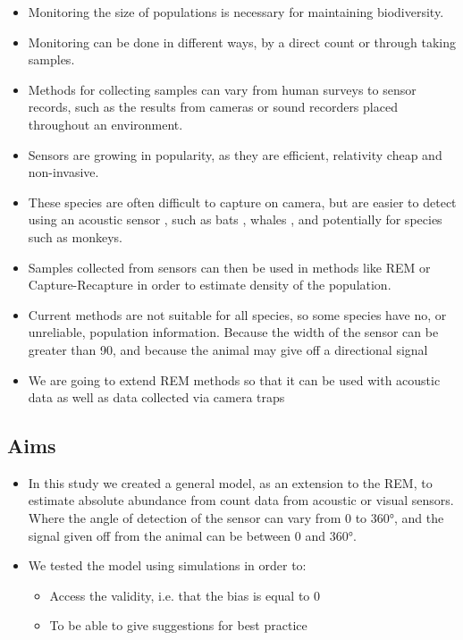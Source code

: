 \documentclass[a4paper,10pt,reqno,oneside]{amsart}
\begin{document}
\begin{itemize}
\item Monitoring the size of populations is necessary for maintaining biodiversity.
\item Monitoring can be done in different ways, by a direct count or through taking samples. \citep{pollock2002large}
\item Methods for collecting samples can vary from human surveys to sensor records, such as the results from cameras or sound recorders placed throughout an environment. 
\item Sensors are growing in popularity, as they are efficient, relativity cheap and non-invasive. \citep{gese2001monitoring}
\item These species are often difficult to capture on camera, but are easier to detect using an acoustic sensor \citep{rogers2013density}, such as bats \citep{ofarrel1999comparison}, whales \citep{mcdonald1999passive}, and potentially for species such as monkeys. 
\item Samples collected from sensors can then be used in methods like REM or Capture-Recapture in order to estimate density of the population.
\item Current methods are not suitable for all species, so some species have no, or unreliable, population information. Because the width of the sensor can be greater than 90, and because the animal may give off a directional signal 
\item We are going to extend REM methods so that it can be used with acoustic data as well as data collected via camera traps
\end{itemize}



\subsection{Aims}

\begin{itemize}
\item  In this study we created a general model, as an extension to the REM, to estimate absolute abundance from count data from acoustic or visual sensors. Where the angle of detection of the sensor can vary from 0 to 360°, and the signal given off from the animal can be between 0 and 360°.
\item  We tested the model using simulations in order to:
\begin{itemize}
\item Access the validity, i.e. that the bias is equal to 0
\item  To be able to give suggestions for best practice
\end{itemize}
\end{itemize}
\end{document}
